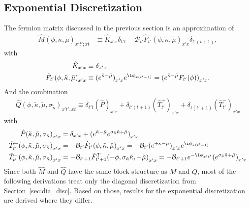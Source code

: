 \documentclass[a4paper, fleqn, twoside, notitlepage]{scrartcl}
\begin{document}
\subsection{Exponential Discretization}\label{sec:exp_disc}

The fermion matrix discussed in the previous section is an approximation of
\begin{align}
  {\hat{M}(\phi, \tilde{\kappa}, \tilde{\mu})}_{x't';xt}
  &\equiv {\hat{K}}_{x'x}\delta_{t't} - \mathcal{B}_{t'}{\hat{F}_{t'}(\phi, \tilde{\kappa}, \tilde{\mu})}_{x'x}\delta_{t'(t+1)},\label{eq:def_m_exp}
\end{align}
with
\begin{align}
  {\hat{K}}_{x'x} &\equiv \delta_{x'x}\\
  {\hat{F}_{t'}(\phi, \tilde{\kappa}, \tilde{\mu})}_{x'x} &\equiv {(e^{\tilde{\kappa}-\tilde{\mu}})}_{x'x} e^{\i \phi_{x(t'-1)}} = {(e^{\tilde{\kappa}-\tilde{\mu}} F_{t'}(\phi) )}_{x'x}.
\end{align}
And the combination
\begin{align}
  {\hat{Q}(\phi, \tilde{\kappa}, \tilde{\mu}, \sigma_{\tilde{\kappa}})}_{x't',xt}
  \equiv \delta_{t't}{(\hat{P})}_{x'x} + \delta_{t'(t+1)}{(\hat{T}^+_{t'})}_{x'x} + \delta_{t(t'+1)}{(\hat{T}^-_{t'})}_{x'x}
\end{align}
with
\begin{align}
  {\hat{P}(\tilde{\kappa}, \tilde{\mu}, \sigma_{\tilde{\kappa}})}_{x'x} &= \delta_{x'x} + {(e^{\tilde{\kappa}-\tilde{\mu}} e^{\sigma_{\tilde{\kappa}}\tilde{\kappa} + \tilde{\mu}})}_{x'x}\\
  {\hat{T}^+_{t'}(\phi, \tilde{\kappa}, \tilde{\mu}, \sigma_{\tilde{\kappa}})}_{x'x} &= - \mathcal{B}_{t'} {\hat{F}_{t'}(\phi, \tilde{\kappa}, \tilde{\mu})}_{x'x} = - \mathcal{B}_{t'} {(e^{+\tilde{\kappa}-\tilde{\mu}})}_{x'x} e^{\i \phi_{x(t'-1)}}\\
  {\hat{T}^-_{t'}(\phi, \tilde{\kappa}, \tilde{\mu}, \sigma_{\tilde{\kappa}})}_{x'x} &= - \mathcal{B}_{t'+1} {\hat{F}^T_{t'+1}(-\phi, \sigma_{\tilde{\kappa}}\tilde{\kappa}, -\tilde{\mu})}_{x'x} = - \mathcal{B}_{t'+1} e^{-\i \phi_{x't'}} {(e^{\sigma_{\tilde{\kappa}}\tilde{\kappa}+\tilde{\mu}})}_{x'x}
\end{align}
Since both $\hat{M}$ and $\hat{Q}$ have the same block structure as $M$ and $Q$, most of the following derivations treat only the diagonal discretization from Section~\ref{sec:dia_disc}.
Based on those, results for the exponential discretization are derived where they differ.
\end{document}
